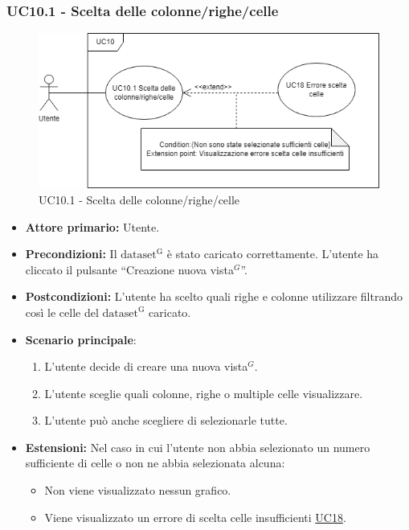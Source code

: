 \subsubsection{UC10.1 - Scelta delle colonne/righe/celle}
\label{sec:UC10.1}
\begin{figure}[H]
    \centering
    \includegraphics[scale=0.60]{../../assets/scelta_colonne_righe_celle.png}
    \caption{UC10.1 - Scelta delle colonne/righe/celle}
\end{figure}

\begin{itemize}
    \item \textbf{Attore primario:} Utente.
    \item \textbf{Precondizioni:} Il ${\mathrm{dataset^{G}}}$ è stato caricato correttamente. L'utente ha cliccato il pulsante ``Creazione nuova vista$^{G}$''.
    \item \textbf{Postcondizioni:} L'utente ha scelto quali righe e colonne utilizzare filtrando così le celle del ${\mathrm{dataset^{G}}}$ caricato.
    \item \textbf{Scenario principale}:
    \begin{enumerate}
		\item L'utente decide di creare una nuova vista$^{G}$.
		\item L'utente sceglie quali colonne, righe o multiple celle visualizzare.
		\item L'utente può anche scegliere di selezionarle tutte.
	\end{enumerate}
	\item \textbf{Estensioni:} Nel caso in cui l'utente non abbia selezionato un numero sufficiente di celle o non ne abbia selezionata alcuna:
              \begin{itemize}
                  \item Non viene visualizzato nessun grafico.
                  \item Viene visualizzato un errore di scelta celle insufficienti \hyperref[sec:UC18 - Errore-celle-insufficienti]{UC18}.
              \end{itemize}
\end{itemize}


